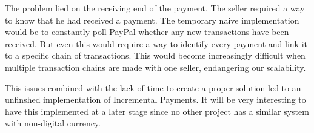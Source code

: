 The problem lied on the receiving end of the payment.
The seller required a way to know that he had received a payment.
The temporary naive implementation would be to constantly poll PayPal whether any new transactions have been received.
But even this would require a way to identify every payment and link it to a specific chain of transactions.
This would become increasingly difficult when multiple transaction chains are made with one seller, endangering our scalability.

This issues combined with the lack of time to create a proper solution led to an unfinshed implementation of Incremental Payments.
It will be very interesting to have this implemented at a later stage since no other project has a similar system with non-digital currency.